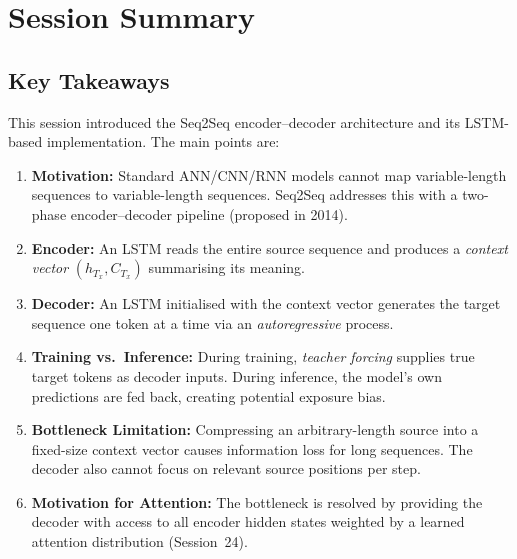 \documentclass[12pt,a4paper]{article}
\begin{document}
\section{Session Summary}
\label{sec:summary}

\subsection{Key Takeaways}

This session introduced the Seq2Seq encoder--decoder architecture and its LSTM-based
implementation. The main points are:

\begin{enumerate}[noitemsep]
  \item \textbf{Motivation:} Standard ANN/CNN/RNN models cannot map variable-length sequences
        to variable-length sequences. Seq2Seq addresses this with a two-phase encoder--decoder
        pipeline (proposed in 2014).

  \item \textbf{Encoder:} An LSTM reads the entire source sequence and produces a
        \emph{context vector} $(h_{T_x}, C_{T_x})$ summarising its meaning.

  \item \textbf{Decoder:} An LSTM initialised with the context vector generates the target
        sequence one token at a time via an \emph{autoregressive} process.

  \item \textbf{Training vs.\ Inference:} During training, \emph{teacher forcing} supplies
        true target tokens as decoder inputs. During inference, the model's own predictions
        are fed back, creating potential exposure bias.

  \item \textbf{Bottleneck Limitation:} Compressing an arbitrary-length source into a
        fixed-size context vector causes information loss for long sequences. The decoder
        also cannot focus on relevant source positions per step.

  \item \textbf{Motivation for Attention:} The bottleneck is resolved by providing the decoder
        with access to all encoder hidden states weighted by a learned attention distribution
        (Session~24).
\end{enumerate}
\end{document}
